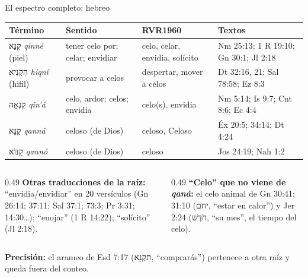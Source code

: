 \documentclass[hyperref={bookmarks=false},aspectratio=169]{beamer}
\newcommand{\heb}[1]{\mbox{\foreignlanguage{hebrew}{#1}}}
\newcommand{\precision}[1]{{\footnotesize\color{gris}\textbf{Precisión:} #1}}
\begin{document}
\begin{frame}{El espectro completo: hebreo}
\scriptsize\renewcommand{\arraystretch}{1.12}
\begin{tabular}{@{}>{\RaggedRight\arraybackslash}p{2.9cm}>{\RaggedRight\arraybackslash}p{3.0cm}>{\RaggedRight\arraybackslash}p{2.6cm}>{\RaggedRight\arraybackslash}p{3.2cm}@{}}
\toprule
\textbf{Término} & \textbf{Sentido} & \textbf{RVR1960} & \textbf{Textos} \\ \midrule
\heb{קִנֵּא} \emph{qinné} (piel) & tener celo por; celar; envidiar & celo, celar, envidia, solícito & Nm 25:13; 1 R 19:10; Gn 30:1; Jl 2:18 \\
\heb{הִקְנִיא} \emph{hiqní} (hifil) & provocar a celos & despertar, mover a celos & Dt 32:16, 21; Sal 78:58; Ez 8:3 \\
\heb{קִנְאָה} \emph{qin'á} & celo, ardor; celos; envidia & celo(s), envidia & Nm 5:14; Is 9:7; Cnt 8:6; Ec 4:4 \\
\heb{קַנָּא} \emph{qanná} & celoso (de Dios) & celoso, Celoso & Éx 20:5; 34:14; Dt 4:24 \\
\heb{קַנּוֹא} \emph{qannó} & celoso (de Dios) & celoso & Jos 24:19; Nah 1:2 \\
\bottomrule
\end{tabular}\par\medskip
\begin{columns}[t,onlytextwidth]
\begin{column}{0.49\textwidth}\scriptsize
\textbf{Otras traducciones de la raíz:} ``envidia/envidiar'' en 20 versículos (Gn 26:14; 37:11; Sal 37:1; 73:3; Pr 3:31; 14:30\ldots); ``enojar'' (1 R 14:22); ``solícito'' (Jl 2:18).
\end{column}
\begin{column}{0.49\textwidth}\scriptsize
\textbf{``Celo'' que no viene de \emph{qaná}:} el celo animal de Gn 30:41; 31:10 (\heb{יחם}, ``estar en calor'') y Jer 2:24 (\heb{חֹדֶשׁ}, ``su mes'', el tiempo del celo).
\end{column}
\end{columns}
\precision{el arameo de Esd 7:17 (\heb{תִקְנֵא}, ``comprarás'') pertenece a otra raíz y queda fuera del conteo.}
\end{frame}
\end{document}
